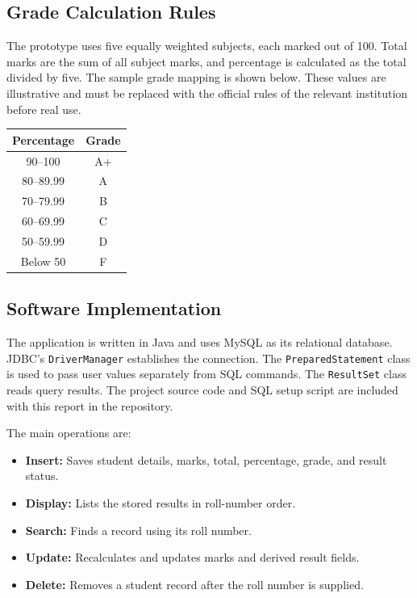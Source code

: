\documentclass[11pt,a4paper]{report}
\begin{document}
\subsection{Grade Calculation Rules}
The prototype uses five equally weighted subjects, each marked out of 100. Total marks are the sum of all subject marks, and percentage is calculated as the total divided by five. The sample grade mapping is shown below. These values are illustrative and must be replaced with the official rules of the relevant institution before real use.

\begin{center}
\begin{tabular}{|c|c|}\hline
\textbf{Percentage} & \textbf{Grade}\\\hline
90--100 & A+\\\hline
80--89.99 & A\\\hline
70--79.99 & B\\\hline
60--69.99 & C\\\hline
50--59.99 & D\\\hline
Below 50 & F\\\hline
\end{tabular}
\end{center}

\subsection{Software Implementation}
The application is written in Java and uses MySQL as its relational database. JDBC's \texttt{DriverManager} establishes the connection. The \texttt{PreparedStatement} class is used to pass user values separately from SQL commands. The \texttt{ResultSet} class reads query results. The project source code and SQL setup script are included with this report in the repository.

The main operations are:
\begin{itemize}
\item \textbf{Insert:} Saves student details, marks, total, percentage, grade, and result status.
\item \textbf{Display:} Lists the stored results in roll-number order.
\item \textbf{Search:} Finds a record using its roll number.
\item \textbf{Update:} Recalculates and updates marks and derived result fields.
\item \textbf{Delete:} Removes a student record after the roll number is supplied.
\end{itemize}
\end{document}
